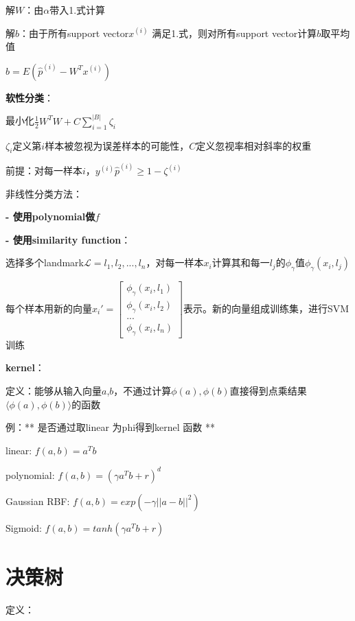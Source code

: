 \documentclass[UTF8]{ctexart}
\begin{document}
  \quad \quad \quad 解$W$：由$\alpha$带入1.式计算

  \quad \quad \quad 解$b$：由于所有support vector$x^{(i)}$ 满足1.式，则对所有support vector计算$b$取平均值

  \quad \quad \quad \quad $b = E(\hat{p}^{(i)}-W^Tx^{(i)})$
  
  \quad \textbf{软性分类}：

  \quad \quad 最小化$\frac{1}{2}W^TW + C\sum_{i=1}^{|B|}\zeta_i $

  \quad \quad \quad $\zeta_i$定义第$i$样本被忽视为误差样本的可能性，$C$定义忽视率相对斜率的权重

  \quad \quad 前提：对每一样本$i$，$y^{(i)}\hat{p}^{(i)} \geq 1 - \zeta^{(i)}$

  非线性分类方法：

  \textbf{- 使用polynomial做$f$}

  \textbf{- 使用similarity function}：
  
  \quad 选择多个landmark$\mathcal{L} = l_1, l_2, ..., l_n$，对每一样本$x_i$计算其和每一$l_j$的$\phi_{\gamma}$值$\phi_{\gamma}(x_i, l_j)$

  \quad 每个样本用新的向量$x_i' = \begin{bmatrix}
    \phi_{\gamma}(x_i, l_1) \\
    \phi_{\gamma}(x_i, l_2) \\
    ... \\
    \phi_{\gamma}(x_i, l_n)
  \end{bmatrix}$表示。新的向量组成训练集，进行SVM训练

  \textbf{kernel}：

  \quad 定义：能够从输入向量$a$,$b$，不通过计算$\phi(a), \phi(b)$直接得到点乘结果$\langle \phi (a), \phi (b)\rangle $的函数

  \quad 例：** 是否通过取linear 为phi得到kernel 函数 **

  \quad \quad linear: $f(a, b) = a^Tb$

  \quad \quad polynomial: $f(a, b) = (\gamma a^Tb+r)^d$

  \quad \quad Gaussian RBF: $f(a, b) = exp(-\gamma ||a-b||^2)$

  \quad \quad Sigmoid: $f(a, b) = tanh(\gamma a^Tb + r)$

\section{决策树}
\noindent 定义：
\end{document}
